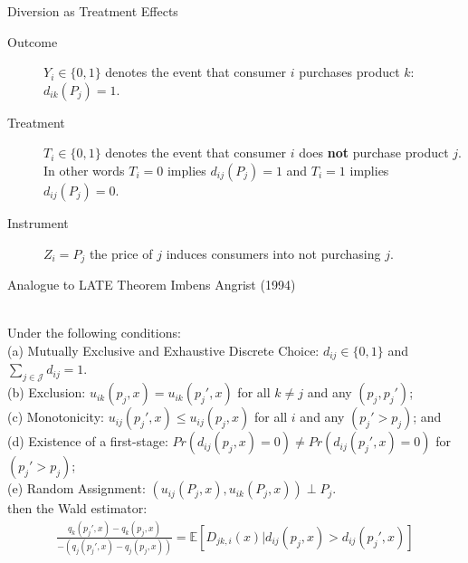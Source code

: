 \begin{frame}{Diversion as Treatment Effects}
\begin{description}
\item[Outcome] $Y_i \in \{0,1\}$ denotes the event that consumer $i$ purchases product $k$: $d_{ik}(P_j)=1$.
\item[Treatment] $T_i \in \{0,1\}$ denotes the event that consumer $i$ does \textbf{not} purchase product $j$. In other words $T_i = 0$ implies $d_{ij}(P_j)=1$ and $T_i=1$ implies $d_{ij}(P_j)=0$.
\item[Instrument] $Z_i = P_j$ the price of $j$ induces consumers into not purchasing $j$.
\end{description}
\end{frame}




\begin{frame}{Analogue to LATE Theorem Imbens Angrist (1994)}
\begin{theorem}\ \\
\label{prop:late}
Under the following conditions:\\ 
(a) Mutually Exclusive and Exhaustive Discrete Choice: $d_{ij} \in \{0,1\}$ and $\sum_{j \in \mathcal{J}} d_{ij}=1$.\\
(b) Exclusion: $u_{ik}(p_j,x)=u_{ik}(p_j',x)$ for all $k \neq j$ and any $(p_j, p_j')$; \\
(c) Monotonicity: $u_{ij}(p_j',x) \leq u_{ij}(p_j,x)$ for all $i$ and any $(p_j' > p_{j})$; and \\
(d) Existence of a first-stage: $Pr(d_{ij}(p_j,x)=0) \neq Pr(d_{ij}(p_j',x)=0) $ for $(p_j' > p_{j})$; \\
(e) Random Assignment: $(u_{ij}(P_j,x),u_{ik}(P_j,x)) \perp P_j$. \\
\noindent
then the Wald estimator:
\begin{align*}
 \frac{q_k(p_j',x) - q_k(p_j,x)}{-\left(q_j(p_j',x) - q_j(p_j,x)\right)}=\mathbb{E}[D_{jk,i}(x) | d_{ij}(p_j,x) > d_{ij}(p_j',x)]
\end{align*}
\end{theorem}
\end{frame}

